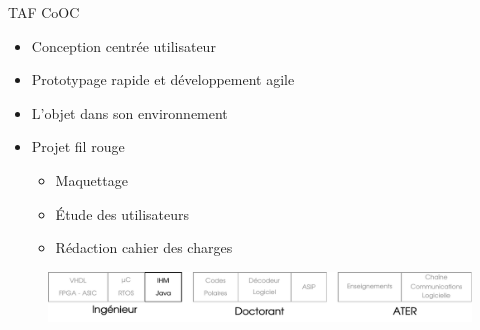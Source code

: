 \documentclass[t,compress,mathserif,12pt,xcolor=dvipsnames]{beamer}
\begin{document}
\begin{frame}[t]{TAF CoOC}
  \begin{minipage}[t][5.0cm][t]{\textwidth}
        \begin{itemize}
          \item<+-> Conception centrée utilisateur
          \item<+-> Prototypage rapide et développement agile
          \item<+-> L'objet dans son environnement
          \item<+-> Projet fil rouge
          \begin{itemize}
            \item<+-> Maquettage
            \item<+-> \'Etude des utilisateurs
            \item<+-> Rédaction cahier des charges
          \end{itemize}
        \end{itemize}
  \end{minipage}
  \begin{figure}[htp]
    \centering
    \includegraphics[width=\textwidth]{fig/frise19}
  \end{figure}


\end{frame}
\end{document}
